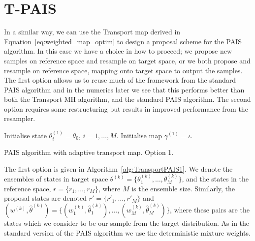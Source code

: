 \documentclass[final]{siamltex}
\begin{document}
\section{T-PAIS}\label{sec:TPAIS}

In a similar way, we can use the Transport map derived in Equation~\eqref{eq:weighted_map_optim} to
design a proposal scheme for the PAIS algorithm. In this case we have a choice in how to proceed; we
propose new samples on reference space and resample on target space, or we both propose and resample on reference space, mapping onto target space to output the samples. The first option allows us to reuse much of the framework
from the standard PAIS algorithm and in the numerics later we see that this performs better than
both the Transport MH algorithm, and the standard PAIS algorithm. The second option requires some
restructuring but results in improved performance from the resampler.

\begin{table}
\begin{algorithm}[H]
\DontPrintSemicolon
\BlankLine
Initialise state $\theta^{(1)}_i = \theta_0$, \quad $i = 1,\dots,M$.\;
Initialise map $\bar{\gamma}^{(1)} = \iota$.\;
\caption{PAIS algorithm with adaptive transport map. Option 1.\label{alg:TransportPAIS1}}
\end{algorithm}
\end{table}

The first option is given in Algorithm~\ref{alg:TransportPAIS1}. We denote the ensembles of states in target space $\theta^{(k)} = \{\theta^{(k)}_1,\dots,\theta^{(k)}_M\}$, and the states in the reference space, $r = \{r_1,\dots,r_M\}$, where $M$ is the ensemble size. Similarly, the proposal states are denoted $r' = \{r'_1,\dots,r'_M\}$ and $(w^{(k)}, \hat{\theta}^{(k)}) = \{(w^{(k)}_1, \hat{\theta}^{(k)}_1),\dots,(w^{(k)}_M, \hat{\theta}^{(k)}_M)\}$, where these pairs are the states which we consider to be our sample from the target distribution. As in the standard version of the PAIS algorithm we use the deterministic mixture weights.
\end{document}
